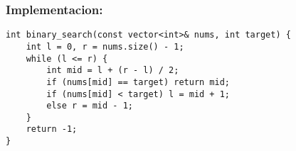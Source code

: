 \subsubsection{Implementacion:}
\begin{lstlisting}[style=cpp]
int binary_search(const vector<int>& nums, int target) {
    int l = 0, r = nums.size() - 1;
    while (l <= r) {
        int mid = l + (r - l) / 2;
        if (nums[mid] == target) return mid;
        if (nums[mid] < target) l = mid + 1;
        else r = mid - 1;
    }
    return -1;
}
\end{lstlisting}

